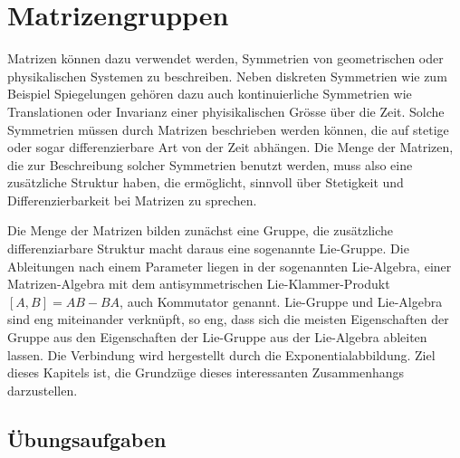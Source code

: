 %
%
%
\chapter{Matrizengruppen
\label{buch:chapter:matrizengruppen}}
\rhead{}
Matrizen können dazu verwendet werden, Symmetrien von geometrischen oder
physikalischen Systemen zu beschreiben.
Neben diskreten Symmetrien wie zum Beispiel Spiegelungen gehören dazu
auch kontinuierliche Symmetrien wie Translationen oder Invarianz einer
phyisikalischen Grösse über die Zeit.
Solche Symmetrien müssen durch Matrizen beschrieben werden können,
die auf stetige oder sogar differenzierbare Art von der Zeit abhängen.
Die Menge der Matrizen, die zur Beschreibung solcher Symmetrien benutzt
werden, muss also eine zusätzliche Struktur haben, die ermöglicht, 
sinnvoll über Stetigkeit und Differenzierbarkeit bei Matrizen
zu sprechen.

Die Menge der Matrizen bilden zunächst eine Gruppe,
die zusätzliche differenziarbare Struktur macht daraus
eine sogenannte Lie-Gruppe.
Die Ableitungen nach einem Parameter liegen in der sogenannten
Lie-Algebra, einer Matrizen-Algebra mit dem antisymmetrischen
Lie-Klammer-Produkt $[A,B]=AB-BA$, auch Kommutator genannt.
Lie-Gruppe und Lie-Algebra sind eng miteinander verknüpft,
so eng, dass sich die meisten Eigenschaften der Gruppe aus den Eigenschaften
der Lie-Gruppe aus der Lie-Algebra ableiten lassen.
Die Verbindung wird hergestellt durch die Exponentialabbildung.
Ziel dieses Kapitels ist, die Grundzüge dieses interessanten 
Zusammenhangs darzustellen.




%

\section*{Übungsaufgaben}
\begin{uebungsaufgaben}
\end{uebungsaufgaben}

